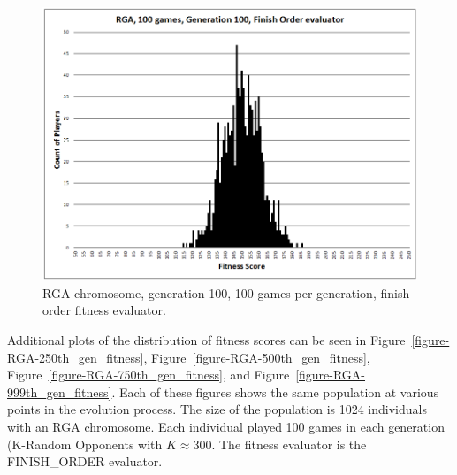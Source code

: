 \begin{figure}[htp]
\centerline{\includegraphics[width=1.0\columnwidth]{Figures/RGA_1024_G100_N100_FO.png}}
\caption[RGA Fitness Distribution, 100th Generation]{RGA chromosome, generation
100, 100 games per generation, finish order fitness evaluator.}
\label{figure-100th_gen_fitness}
\end{figure}

Additional plots of the distribution of fitness scores can be seen in
Figure~\ref{figure-RGA-250th_gen_fitness},
Figure~\ref{figure-RGA-500th_gen_fitness},
Figure~\ref{figure-RGA-750th_gen_fitness}, and
Figure~\ref{figure-RGA-999th_gen_fitness}. Each of these figures shows the same
population at various points in the evolution process. The size of the
population is 1024 individuals with an RGA chromosome. Each individual played
100 games in each generation (K-Random Opponents with \(K\approx300\). The
fitness evaluator is the FINISH\_ORDER evaluator.

